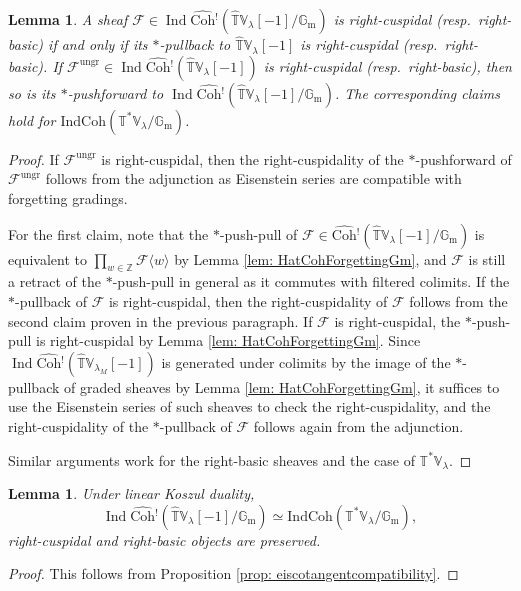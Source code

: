 \documentclass{amsart}
\newtheorem{lemma}[theorem]{Lemma}
\theoremstyle{definition}
\theoremstyle{remark}
\numberwithin{equation}{section}
\DeclareMathOperator{\Ind}{Ind}
\newcommand{\mc}{\mathcal}
\newcommand{\Z}{\mathbb{Z}}
\newcommand{\Gm}{{\mathbb{G}_{\mathrm{m}}}}
\newcommand{\wh}{\widehat}
\newcommand{\IndCoh}{\mathrm{IndCoh}}
\newcommand{\Coh}{\mathrm{Coh}}
\newcommand{\V}{\mathbb{V}}
\newcommand{\T}{\mathbb{T}}
\begin{document}
\begin{lemma}{\label{lem: cusppullpush}}
A sheaf $\mc F\in \Ind\wh{\Coh}{}^!(\wh{\T}\V_\lambda[-1] /\Gm)$ is right-cuspidal (resp.~right-basic) if and only if its $*$-pullback to $\wh{\T}\V_\lambda[-1]$ is right-cuspidal (resp.~right-basic). If $\mc F^{\mathrm{ungr}}\in \Ind\wh{\Coh}{}^! (\wh{\T}\V_\lambda[-1] )$ is right-cuspidal (resp.~right-basic), then so is its $*$-pushforward to $\Ind\wh{\Coh}{}^! (\wh{\T}\V_\lambda[-1] /\Gm)$. The corresponding claims hold for $\IndCoh(\T^* \V_\lambda/\Gm)$.      
\end{lemma}

\begin{proof}
If $\mc F^{\mathrm{ungr}}$ is right-cuspidal, then the right-cuspidality of the $*$-pushforward of $\mc F^{\mathrm{ungr}}$ follows from the adjunction as Eisenstein series are compatible with forgetting gradings. 

For the first claim, note that the $*$-push-pull of $\mc F\in \wh{\Coh}{}^! (\wh{\T}\V_\lambda[-1] /\Gm)$ is equivalent to $\prod_{w\in \Z}\mc F\langle w\rangle $ by Lemma \ref{lem: HatCohForgettingGm}, and $\mc F$ is still a retract of the $*$-push-pull in general as it commutes with filtered colimits. If the $*$-pullback of $\mc F$ is right-cuspidal, then the right-cuspidality of $\mc F$ follows from the second claim proven in the previous paragraph. If $\mc F$ is right-cuspidal, the $*$-push-pull is right-cuspidal by Lemma \ref{lem: HatCohForgettingGm}. Since $\Ind\wh{\Coh}{}^! (\wh{\T}\V_{\lambda_M}[-1])$ is generated under colimits by the image of the $*$-pullback of graded sheaves by Lemma \ref{lem: HatCohForgettingGm}, it suffices to use the Eisenstein series of such sheaves to check the right-cuspidality, and the right-cuspidality of the $*$-pullback of $\mc F$ follows again from the adjunction. 

Similar arguments work for the right-basic sheaves and the case of $\T^*\V_\lambda$. 
\end{proof}

\begin{lemma}{\label{lem: koszulcusp}}
Under linear Koszul duality, 
\[
\Ind\wh{\Coh}{}^!(\wh{\T}\V_\lambda[-1]/\Gm) \simeq
\IndCoh(\T^*\V_\lambda/\Gm), 
\]
right-cuspidal and right-basic objects are preserved. 
\end{lemma}

\begin{proof}
    This follows from Proposition \ref{prop: eiscotangentcompatibility}.
\end{proof}
\end{document}
